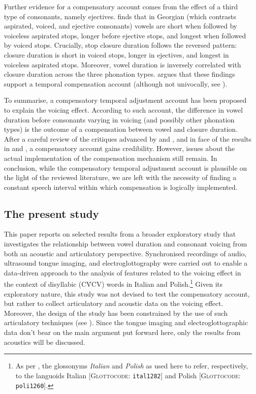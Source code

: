 \documentclass[12pt,]{article}
\let\rmarkdownfootnote\footnote%
\def\footnote{\protect\rmarkdownfootnote}
\begin{document}
Further evidence for a compensatory account comes from the effect of a
third type of consonants, namely ejectives. \citet{begus2017} finds that
in Georgian (which contrasts aspirated, voiced, and ejective consonants)
vowels are short when followed by voiceless aspirated stops, longer
before ejective stops, and longest when followed by voiced stops.
Crucially, stop closure duration follows the reversed pattern: closure
duration is short in voiced stops, longer in ejectives, and longest in
voiceless aspirated stops. Moreover, vowel duration is inversely
correlated with closure duration across the three phonation types.
\citet{begus2017} argues that these findings support a temporal
compensation account (although not univocally, see
\citealt[Section V]{begus2017}).

To summarise, a compensatory temporal adjustment account has been
proposed to explain the voicing effect. According to such account, the
difference in vowel duration before consonants varying in voicing (and
possibly other phonation types) is the outcome of a compensation between
vowel and closure duration. After a careful review of the critiques
advanced by \citet{chen1970} and \citet{maddieson1976}, and in face of
the results in \citet{slis1969} and \citet{begus2017}, a compensatory
account gains credibility. However, issues about the actual
implementation of the compensation mechanism still remain. In
conclusion, while the compensatory temporal adjustment account is
plausible on the light of the reviewed literature, we are left with the
necessity of finding a constant speech interval within which
compensation is logically implemented.

\hypertarget{the-present-study}{%
\subsection{The present study}\label{the-present-study}}

This paper reports on selected results from a broader exploratory study
that investigates the relationship between vowel duration and consonant
voicing from both an acoustic and articulatory perspective. Synchronised
recordings of audio, ultrasound tongue imaging, and electroglottography
were carried out to enable a data-driven approach to the analysis of
features related to the voicing effect in the context of disyllabic
(CV́CV) words in Italian and
Polish.\footnote{As per \citet{cysouw2013}, the glossonyms \textit{Italian} and \textit{Polish} as used here to refer, respectively, to the languoids Italian [\textsc{Glottocode}: \texttt{ital1282}] and Polish [\textsc{Glottocode}: \texttt{poli1260}].}
Given its exploratory nature, this study was not devised to test the
compensatory account, but rather to collect articulatory and acoustic
data on the voicing effect. Moreover, the design of the study has been
constrained by the use of such articulatory techniques (see
). Since the tongue imaging and electroglottographic data
don't bear on the main argument put forward here, only the results from
acoustics will be discussed.
\end{document}
